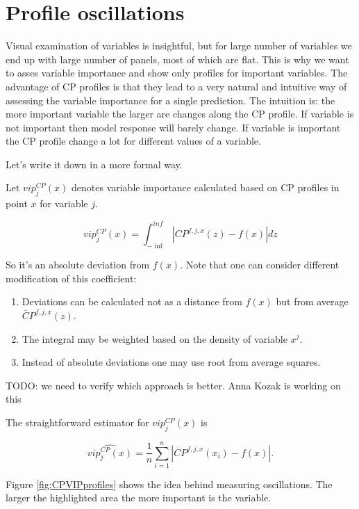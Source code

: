 \documentclass[]{book}
\providecommand{\tightlist}{%
  \setlength{\itemsep}{0pt}\setlength{\parskip}{0pt}}
\theoremstyle{definition}
\theoremstyle{definition}
\theoremstyle{definition}
\theoremstyle{remark}
\begin{document}
\hypertarget{oscillations}{%
\section{Profile oscillations}\label{oscillations}}

Visual examination of variables is insightful, but for large number of
variables we end up with large number of panels, most of which are flat.
This is why we want to asses variable importance and show only profiles
for important variables. The advantage of CP profiles is that they lead
to a very natural and intuitive way of assessing the variable importance
for a single prediction. The intuition is: the more important variable
the larger are changes along the CP profile. If variable is not
important then model response will barely change. If variable is
important the CP profile change a lot for different values of a
variable.

Let's write it down in a more formal way.

Let \(vip^{CP}_j(x)\) denotes variable importance calculated based on CP
profiles in point \(x\) for variable \(j\).

\[
vip^{CP}_j(x) = \int_{-\inf}^{inf} |CP^{f,j,x}(z) - f(x)| dz
\]

So it's an absolute deviation from \(f(x)\). Note that one can consider
different modification of this coefficient:

\begin{enumerate}
\def\labelenumi{\arabic{enumi}.}
\tightlist
\item
  Deviations can be calculated not as a distance from \(f(x)\) but from
  average \(\bar CP^{f,j,x}(z)\).
\item
  The integral may be weighted based on the density of variable \(x^j\).
\item
  Instead of absolute deviations one may use root from average squares.
\end{enumerate}

TODO: we need to verify which approach is better. Anna Kozak is working
on this

The straightforward estimator for \(vip^{CP}_j(x)\) is

\[
\widehat{ vip^{CP}_j(x)} = \frac 1n \sum_{i=1}^n |CP^{f,j,x}(x_i) - f(x)|.
\]

Figure \ref{fig:CPVIPprofiles} shows the idea behind measuring
oscillations. The larger the highlighted area the more important is the
variable.
\end{document}

